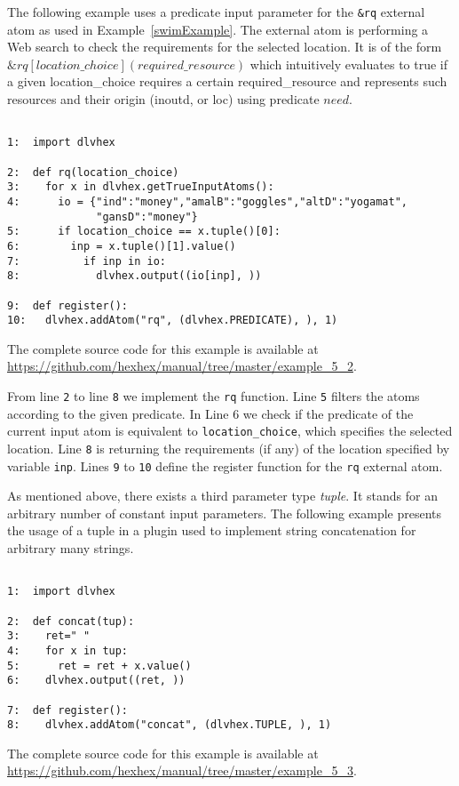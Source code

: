 \documentclass[a4paper, titlepage]{article}
\newcommand{\ext}[3]{\ensuremath{\&{#1}[#2](#3)}}
\newcommand{\examplelink}[1]{\url{https://github.com/hexhex/manual/tree/master/#1}}
\begin{document}
The following example uses a predicate input parameter 
for the \verb+&rq+ external atom as used in Example~\ref{swimExample}. The external atom is performing 
a Web search to check the requirements for the selected location. It is of the form 
$\ext{\mathit{rq}}{\mathit{location\_choice}}
{\mathit{required\_resource}}$ which intuitively evaluates 
to true if a given location\_choice requires a certain 
required\_resource and represents such resources and their 
origin (inoutd, or loc) using predicate $\mathit{need}$. 
\begin{exmp}
\label{predicateAsInput}
\begin{verbatim}

1:  import dlvhex 

2:  def rq(location_choice)
3:    for x in dlvhex.getTrueInputAtoms():
4:      io = {"ind":"money","amalB":"goggles","altD":"yogamat",
              "gansD":"money"}
5:      if location_choice == x.tuple()[0]:
6:        inp = x.tuple()[1].value()
7:          if inp in io:
8:            dlvhex.output((io[inp], ))

9:  def register():
10:   dlvhex.addAtom("rq", (dlvhex.PREDICATE), ), 1)
\end{verbatim}
\end{exmp}
The complete source code for this example is available at \examplelink{example_5_2}.

From line \verb+2+ to line \verb+8+ we implement the \verb+rq+ function. Line \verb+5+ filters the atoms according to the given predicate. In Line 6 we check if the predicate of the current input atom is equivalent to \texttt{location\_choice}, which specifies the selected location. Line \verb+8+ is returning  
the requirements (if any) of the location specified by variable 
\verb+inp+. Lines \verb+9+ to \verb+10+ define the register 
function for the \verb+rq+ external atom.

As mentioned above, there exists a third parameter type \emph{tuple}. It stands for an arbitrary number of constant input parameters. The following example presents the usage of a tuple in a plugin used to implement string concatenation for arbitrary many strings.  
\begin{exmp}
\label{tupleAsInput}
\begin{verbatim}

1:  import dlvhex

2:  def concat(tup):
3:    ret=" "
4:    for x in tup:
5:      ret = ret + x.value()
6:    dlvhex.output((ret, ))

7:  def register():
8:    dlvhex.addAtom("concat", (dlvhex.TUPLE, ), 1)
\end{verbatim}
\end{exmp}
The complete source code for this example is available at \examplelink{example_5_3}.
\end{document}
